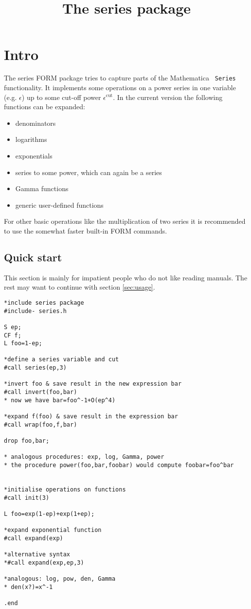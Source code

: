 \documentclass{article}
\begin{document}
\title{The series package}

\section{Intro}

The series FORM package tries to capture parts of the Mathematica {\tt
  Series} functionality. It implements some operations on a power
series in one variable
(e.g. $\epsilon$) up to some cut-off power $\epsilon^{\text{cut}}$. In
the current version the following functions can be expanded:
\begin{itemize}
\item denominators
\item logarithms
\item exponentials
\item series to some power, which can again be a series
\item Gamma functions
\item generic user-defined functions
\end{itemize}
For other basic operations like the multiplication of two series it
is recommended to use the somewhat faster built-in FORM commands.

\subsection{Quick start}
\label{sec:quick}

This section is mainly for impatient people who do not like reading
manuals. The rest may want to continue with section \ref{sec:usage}.

\begin{verbatim}
*include series package
#include- series.h

S ep;
CF f;
L foo=1-ep;

*define a series variable and cut
#call series(ep,3)

*invert foo & save result in the new expression bar
#call invert(foo,bar)
* now we have bar=foo^-1+O(ep^4)

*expand f(foo) & save result in the expression bar
#call wrap(foo,f,bar)

drop foo,bar;

* analogous procedures: exp, log, Gamma, power
* the procedure power(foo,bar,foobar) would compute foobar=foo^bar


*initialise operations on functions
#call init(3)

L foo=exp(1-ep)+exp(1+ep);

*expand exponential function
#call expand(exp)

*alternative syntax
*#call expand(exp,ep,3)

*analogous: log, pow, den, Gamma
* den(x?)=x^-1

.end
\end{verbatim}
\end{document}
